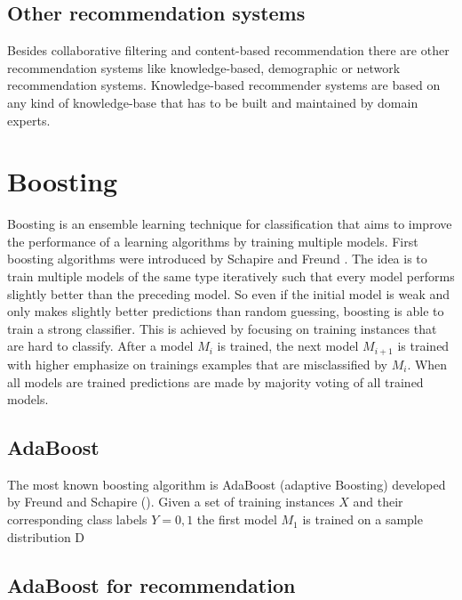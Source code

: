 \documentclass[10pt]{reportMaster}
\begin{document}
 
\section{Other recommendation systems}
\label{rs_others}
Besides collaborative filtering and content-based recommendation there are other recommendation systems like knowledge-based, demographic or network recommendation systems.
Knowledge-based recommender systems are based on any kind of knowledge-base that has to be built and maintained by domain experts.




\chapter{Boosting}
Boosting is an ensemble learning technique for classification that aims to improve the performance of a learning algorithms by training multiple models.
First boosting algorithms were introduced by Schapire \cite{boostingSchapire} and Freund \cite{boostingFreund}.
The idea is to train multiple models of the same type iteratively such that every model performs slightly better than the preceding model.
So even if the initial model is weak and only makes slightly better predictions than random guessing, boosting is able to train a strong classifier.
This is achieved by focusing on training instances that are hard to classify.
After a model $M_i$ is trained, the next model $M_{i+1}$ is trained with higher emphasize on trainings examples that are misclassified by $M_i$. 
When all models are trained predictions are made by majority voting of all trained models.

\section{AdaBoost}
The most known boosting algorithm is AdaBoost (adaptive Boosting) developed by Freund and Schapire (\cite{boostingIntro}).
Given a set of training instances $X$ and their corresponding class labels $Y = {0, 1}$ the first model $M_1$ is trained on a sample distribution D



\section{AdaBoost for recommendation}
\end{document}
